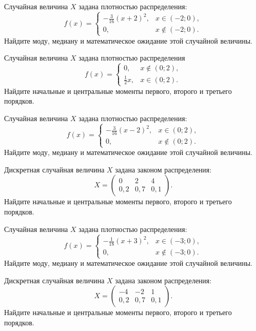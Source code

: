 \vfill

\newpage\setcounter{zad}{0}

\z Случайная величина $X$ задана плотностью распределения: $$f(x) = \begin{cases} -\frac{3}{16}(x+2)^2, & x \in (-2; 0), \\ 0, & x \not\in (-2; 0). \end{cases}$$ Найдите моду, медиану и математическое ожидание этой случайной величины.


\vfill

\z Случайная величина $X$ задана плотностью распределения $$f(x) = \begin{cases}0, & x\not\in(0; 2), \\ \frac{1}{2}x, & x\in(0; 2).\end{cases}$$ Найдите начальные и центральные моменты первого, второго и третьего порядков.
 

\vfill

\newpage\setcounter{zad}{0}

\z Случайная величина $X$ задана плотностью распределения: $$f(x) = \begin{cases} -\frac{3}{16}(x-2)^2, & x \in (0; 2), \\ 0, & x \not\in (0; 2). \end{cases}$$ Найдите моду, медиану и математическое ожидание этой случайной величины.


\vfill

\z Дискретная случайная величина $X$ задана законом распределения: $$ X = \left(\begin{array}{rrr}0 & 2 & 4\\0{,}2 & 0{,}7 & 0{,}1\end{array}\right).$$ Найдите начальные и центральные моменты первого, второго и третьего порядков.
 

\vfill

\newpage\setcounter{zad}{0}

\z Случайная величина $X$ задана плотностью распределения: $$f(x) = \begin{cases} -\frac{1}{18}(x+3)^2, & x \in (-3; 0), \\ 0, & x \not\in (-3; 0). \end{cases}$$ Найдите моду, медиану и математическое ожидание этой случайной величины.


\vfill

\z Дискретная случайная величина $X$ задана законом распределения: $$ X = \left(\begin{array}{rrr}-4 & -2 & 1\\0{,}2 & 0{,}7 & 0{,}1\end{array}\right).$$ Найдите начальные и центральные моменты первого, второго и третьего порядков.
 

